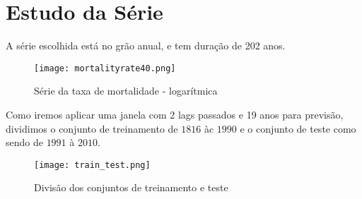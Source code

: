 \documentclass{article}
\begin{document}
\section{Estudo da Série}
A série escolhida está no grão anual, e tem duração de 202 anos. 
\begin{figure}[H]
    \centering
    \texttt{[image: mortalityrate40.png]}
    \caption{Série da taxa de mortalidade - logarítmica}
\end{figure}
Como iremos aplicar uma janela com 2 lags passados e 19 anos para previsão, dividimos o conjunto de treinamento de $1816$ àc $1990$ e o conjunto de teste como sendo de $1991$ à $2010$. 
\begin{figure}[H]
    \centering
    \texttt{[image: train\_test.png]}
    \caption{Divisão dos conjuntos de treinamento e teste}
\end{figure}
\end{document}
